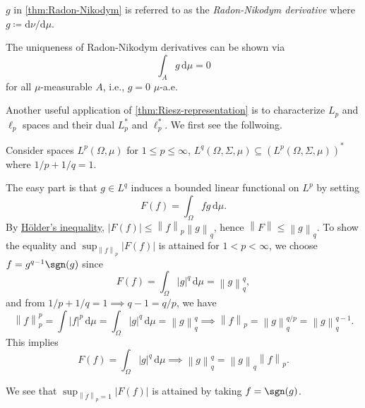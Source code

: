 \begin{notation}
	\(g\) in \autoref{thm:Radon-Nikodym} is referred to as the \emph{Radon-Nikodym derivative} where \(g \coloneqq \mathrm{d}\nu /\mathrm{d}\mu \).
	\begin{note}[Uniqueness]
		The uniqueness of Radon-Nikodym derivatives can be shown via
		\[
			\int _A g\,\mathrm{d} \mu = 0
		\]
		for all \(\mu \)-measurable \(A\), i.e., \(g=0\) \(\mu\)-a.e.
	\end{note}
\end{notation}

Another useful application of \autoref{thm:Riesz-representation} is to characterize \(L_p\) and \(\ell _p\) spaces and their dual \(L^{\ast} _p\) and \(\ell ^{\ast} _p\). We first see the follwoing.
\begin{remark}
	Consider spaces \(L^p(\Omega , \mu )\) for \(1 \leq p \leq \infty \), \(L^{q}(\Omega , \Sigma , \mu )\subseteq (L^p(\Omega , \Sigma , \mu ))^{\ast}\) where \(1 / p + 1 / q = 1\).
\end{remark}
\begin{explanation}
	The easy part is that \(g\in L^q\) induces a bounded linear functional on \(L^p\) by setting
	\[
		F(f) = \int _\Omega fg\,\mathrm{d} \mu.
	\]
	By \hyperref[lma:Holder-ineq]{Hölder's inequality}, \(\left\vert F(f) \right\vert \leq \left\lVert f\right\rVert _p \left\lVert g\right\rVert _q\), hence \(\left\lVert F\right\rVert \leq \left\lVert g\right\rVert _q\). To show the equality and \(\sup _{\left\lVert f\right\rVert _p}\left\vert F(f) \right\vert \) is attained for \(1 < p < \infty \), we choose \(f = g^{q - 1}\sgn(g)\) since
	\[
		F(f) = \int _\Omega \left\vert g \right\vert ^q\,\mathrm{d} \mu = \left\lVert g\right\rVert ^q_q,
	\]
	and from \(1 / p + 1 / q = 1 \implies q-1 = q / p\), we have
	\[
		\left\lVert f\right\rVert ^p_p = \int \left\vert f \right\vert ^p \,\mathrm{d} \mu= \int _\Omega \left\vert g \right\vert ^q\,\mathrm{d} \mu = \left\lVert g\right\rVert _q^q \implies \left\lVert f\right\rVert _p = \left\lVert g\right\rVert _q^{q / p} = \left\lVert g\right\rVert _q^{q - 1}.
	\]
	This implies
	\[
		F(f) = \int _\Omega \left\vert g \right\vert ^q\,\mathrm{d} \mu \implies \left\lVert g\right\rVert ^q_q = \left\lVert g\right\rVert _q \left\lVert f\right\rVert _p.
	\]
	\begin{note}
		We see that \(\sup _{\left\lVert f\right\rVert _p = 1} \left\vert F(f) \right\vert \) is attained by taking \(f = \sgn(g)\).
	\end{note}
\end{explanation}

